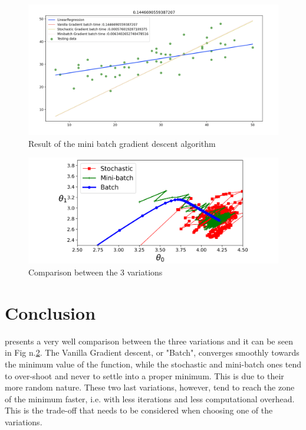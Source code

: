 \documentclass[conference]{IEEEtran}
\begin{document}
\begin{center}
\begin{figure}[ht]
    \includegraphics[width = 11 cm]{Schermata 2021-05-11 alle 16.25.08.png}
    \caption{Result of the mini batch gradient descent algorithm}
    \label{fig:mini_res}
\end{figure}
\end{center}


\begin{center}
\begin{figure}[ht]
    \includegraphics[width = 12cm]{Schermata 2021-05-11 alle 16.26.13.png}
    \caption{Comparison between the 3 variations}
    \label{fig:comparison}
\end{figure}
\end{center}
\section{Conclusion}
\cite{Scikit-Learn} presents a very well comparison between the three variations and it can be seen in Fig n.\ref{fig:comparison}.
The Vanilla Gradient descent, or "Batch", converges smoothly towards the minimum value of the function, while the stochastic and mini-batch ones tend to over-shoot and never to settle into a proper minimum. This is due to their more random nature. These two last variations, however,  tend to reach the zone of the minimum faster, i.e. with less iterations and less computational overhead. 
This is the trade-off that needs to be considered when choosing one of the variations. 
\end{document}

